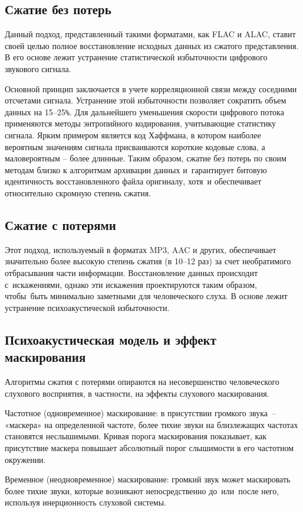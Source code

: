 \documentclass{ou}
\begin{document}
\subsection{Сжатие без потерь} 
Данный подход, представленный такими форматами, как FLAC и ALAC, ставит своей целью полное восстановление исходных данных из сжатого представления. В его основе лежит устранение статистической избыточности цифрового звукового сигнала.

Основной принцип заключается в учете корреляционной связи между соседними отсчетами сигнала. Устранение этой избыточности позволяет сократить объем данных на 15–25\verb|%|. Для дальнейшего уменьшения скорости цифрового потока применяются методы энтропийного кодирования, учитывающие статистику сигнала. Ярким примером является код Хаффмана, в котором наиболее вероятным значениям сигнала присваиваются короткие кодовые слова, а маловероятным -- более длинные. Таким образом, сжатие без потерь по своим методам близко к алгоритмам архивации данных и~гарантирует битовую идентичность восстановленного файла оригиналу, хотя~и обеспечивает относительно скромную степень сжатия.
\subsection{Сжатие с потерями} 
Этот подход, используемый в форматах MP3, AAC и других, обеспечивает значительно более высокую степень сжатия (в 10–12 раз) за счет необратимого отбрасывания части информации. Восстановление данных происходит с~искажениями, однако эти искажения проектируются таким образом, чтобы~быть минимально заметными для человеческого слуха. В основе лежит устранение психоакустической избыточности.
\subsection{Психоакустическая модель и эффект маскирования}
Алгоритмы сжатия с потерями опираются на несовершенство человеческого слухового восприятия, в частности, на эффекты слухового маскирования.

Частотное (одновременное) маскирование: в присутствии громкого звука~-- «маскера» на определенной частоте, более тихие звуки на близлежащих частотах становятся неслышимыми. Кривая порога маскирования показывает, как присутствие маскера повышает абсолютный порог слышимости в его частотном окружении.

Временное (неодновременное) маскирование: громкий звук может маскировать более тихие звуки, которые возникают непосредственно до~или~после него, используя инерционность слуховой системы.
\end{document}
